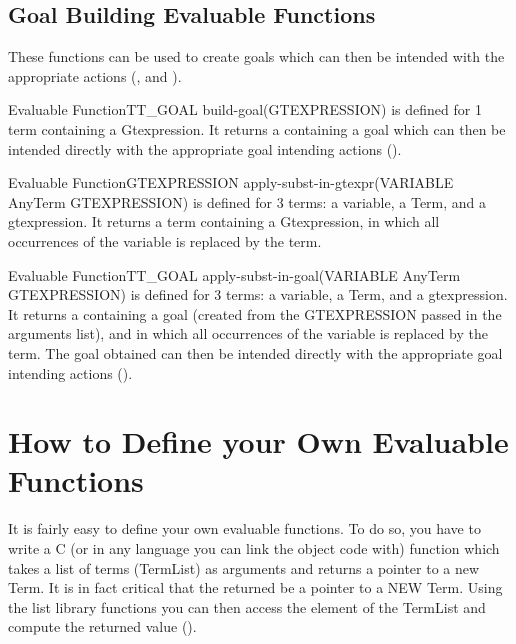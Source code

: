 \subsection{Goal Building Evaluable Functions}

These functions can be used to create goals which can then be intended with the
appropriate actions (, and  ). 

\begin{typeefa}{Evaluable Function}{TT\_GOAL} {build-goal}{(GTEXPRESSION)}
is defined for 1 term containing a Gtexpression. It returns a
 containing a goal which can then be intended directly with the
appropriate goal intending actions ().
\end{typeefa}

\begin{typeefa}{Evaluable Function}{GTEXPRESSION} {apply-subst-in-gtexpr}{(VARIABLE
AnyTerm GTEXPRESSION)}
is defined for 3 terms: a variable, a Term, and a
gtexpression. It returns a term containing a Gtexpression,
in which all occurrences of the variable is replaced by the term. 
\end{typeefa}

\begin{typeefa}{Evaluable Function}{TT\_GOAL} {apply-subst-in-goal}{(VARIABLE AnyTerm GTEXPRESSION)}
is defined for 3 terms: a variable, a Term, and a gtexpression. It returns a
 containing a goal (created from the GTEXPRESSION passed in the
arguments list), and in which all occurrences of the variable is replaced by
the term.  The goal obtained can then be intended directly with the appropriate
goal intending actions ().
\end{typeefa}

\section{How to Define your Own Evaluable Functions}

It is fairly easy to define your own evaluable functions. To do so, you
have to write a C (or in any language you can link the object code with)
function which takes a list of terms (TermList) as arguments and returns a
pointer to a new Term. It is in fact critical that the  returned be
a pointer to a NEW Term. Using the list library functions you can then access
the element of the TermList and compute the returned value ().

